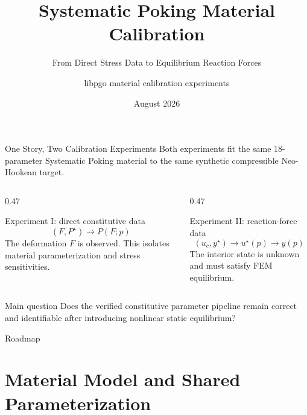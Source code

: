 \documentclass[aspectratio=169,10pt]{beamer}
\title[Systematic Poking Calibration]{Systematic Poking Material Calibration}
\subtitle{From Direct Stress Data to Equilibrium Reaction Forces}
\author{libpgo material calibration experiments}
\date{August 2026}
\begin{document}
\begin{frame}
  \titlepage
\end{frame}

\begin{frame}{One Story, Two Calibration Experiments}
  \small
  Both experiments fit the same 18-parameter Systematic Poking material to
  the same synthetic compressible Neo-Hookean target.

  \vspace{0.6em}
  \begin{columns}[T,onlytextwidth]
    \begin{column}{0.47\linewidth}
      \begin{block}{Experiment I: direct constitutive data}
        \[
          (F,P^\star)
          \longrightarrow
          P(F;p)
        \]
        The deformation $F$ is observed. This isolates material
        parameterization and stress sensitivities.
      \end{block}
    \end{column}
    \begin{column}{0.47\linewidth}
      \begin{block}{Experiment II: reaction-force data}
        \[
          (u_c,y^\star)
          \longrightarrow
          u^\star(p)
          \longrightarrow
          y(p)
        \]
        The interior state is unknown and must satisfy FEM equilibrium.
      \end{block}
    \end{column}
  \end{columns}

  \vspace{0.6em}
  \begin{alertblock}{Main question}
    Does the verified constitutive parameter pipeline remain correct and
    identifiable after introducing nonlinear static equilibrium?
  \end{alertblock}
\end{frame}

\begin{frame}{Roadmap}
  \tableofcontents[hideallsubsections]
\end{frame}

\section{Material Model and Shared Parameterization}
\end{document}
